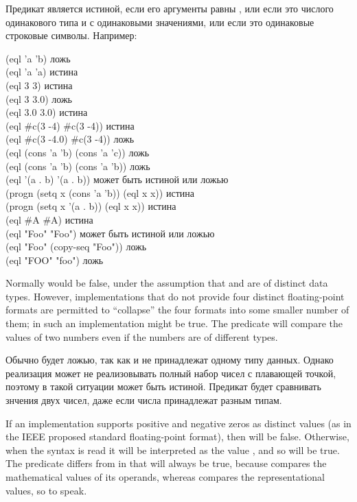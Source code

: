 \begin{defun}[Function]
Предикат  является истиной, если его аргументы равны , или 
если это числого одинакового типа и с одинаковыми значениями, или если это
одинаковые строковые символы.
Например:
\begin{lisp}
(eql 'a 'b) \textrm{ложь} \\
(eql 'a 'a) \textrm{истина} \\
(eql 3 3) \textrm{истина} \\
(eql 3 3.0) \textrm{ложь} \\
(eql 3.0 3.0) \textrm{истина} \\
(eql \#c(3 -4) \#c(3 -4)) \textrm{истина} \\
(eql \#c(3 -4.0) \#c(3 -4)) \textrm{ложь} \\
(eql (cons 'a 'b) (cons 'a 'c)) \textrm{ложь} \\
(eql (cons 'a 'b) (cons 'a 'b)) \textrm{ложь} \\
(eql '(a . b) '(a . b)) \textrm{может быть истиной или ложью} \\
(progn (setq x (cons 'a 'b)) (eql x x)) \textrm{истина} \\
(progn (setq x '(a . b)) (eql x x)) \textrm{истина} \\
(eql \#{\Xbackslash}A \#{\Xbackslash}A) \textrm{истина} \\
(eql "Foo" "Foo") \textrm{может быть истиной или ложью} \\
(eql "Foo" (copy-seq "Foo")) \textrm{ложь} \\
(eql "FOO" "foo") \textrm{ложь}
\end{lisp}

Normally  would be false, under the assumption
that  and  are of distinct data types.
However, implementations that do not provide four distinct floating-point
formats are permitted to ``collapse'' the four formats into some
smaller number of them; in such an implementation 
might be true.  The predicate \cdf{=} will compare
the values of two numbers even if the numbers are of different types.

Обычно  будет ложью, так как  и  не
принадлежат одному типу данных. Однако реализация может не реализовывать полный
набор чисел с плавающей точкой, поэтому в такой ситуации 
может быть истиной. Предикат \cdf{=} будет сравнивать знчения двух чисел, даже
если числа принадлежат разным типам.

If an implementation supports positive and negative zeros as distinct
values (as in the IEEE proposed standard floating-point format),
then  will be false.  Otherwise, when the syntax
 is read it will be interpreted as the value ,
and so  will be true.  The predicate \cdf{=}
differs from  in that  will always be true,
because \cdf{=} compares the mathematical values of its operands,
whereas  compares the representational values, so to speak.


\end{defun}
